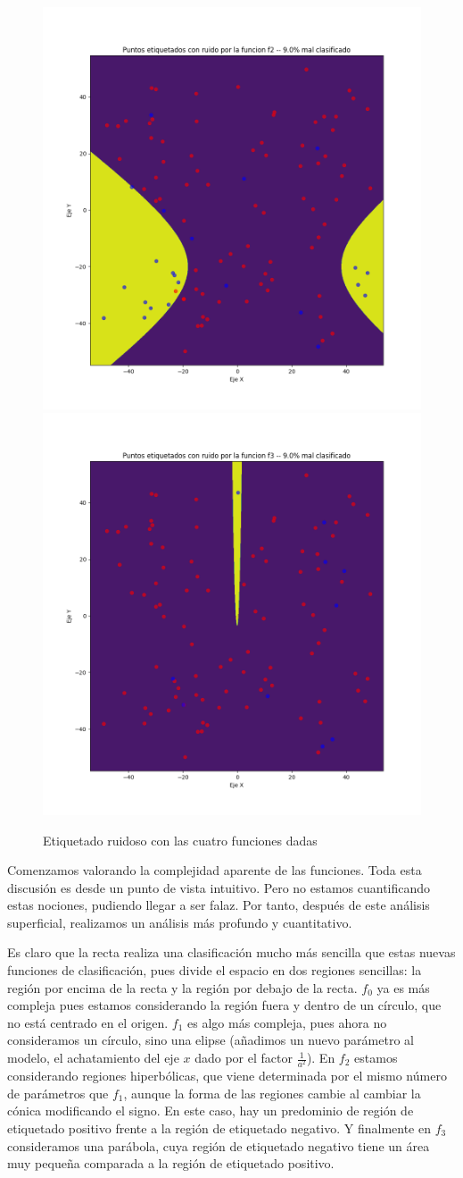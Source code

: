 \documentclass[11pt]{article}
\begin{document}
\begin{figure}[H]
    \includegraphics[width=0.60 \textwidth]{puntos_clasificados_experimento_f2.png}
    \includegraphics[width=0.60 \textwidth]{puntos_clasificados_experimento_f3.png}

    \caption{Etiquetado ruidoso con las cuatro funciones dadas}
\end{figure}

Comenzamos valorando la complejidad aparente de las funciones. Toda esta discusión es desde un punto de vista intuitivo. Pero no estamos cuantificando estas nociones, pudiendo llegar a ser falaz. Por tanto, después de este análisis superficial, realizamos un análisis más profundo y cuantitativo.

Es claro que la recta realiza una clasificación mucho más sencilla que estas nuevas funciones de clasificación, pues divide el espacio en dos regiones sencillas: la región por encima de la recta y la región por debajo de la recta. $f_0$ ya es más compleja pues estamos considerando la región fuera y dentro de un círculo, que no está centrado en el origen. $f_1$ es algo más compleja, pues ahora no consideramos un círculo, sino una elipse (añadimos un nuevo parámetro al modelo, el achatamiento del eje $x$ dado por el factor $\frac{1}{a^2}$). En $f_2$ estamos considerando regiones hiperbólicas, que viene determinada por el mismo número de parámetros que $f_1$, aunque la forma de las regiones cambie al cambiar la cónica modificando el signo. En este caso, hay un predominio de región de etiquetado positivo frente a la región de etiquetado negativo. Y finalmente en $f_3$ consideramos una parábola, cuya región de etiquetado negativo tiene un área muy pequeña comparada a la región de etiquetado positivo.
\end{document}
